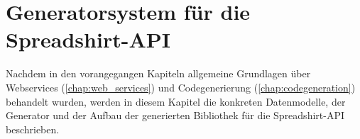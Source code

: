 \chapter{Generatorsystem für die Spreadshirt-API}
\label{chap:generator-system_for_spreadshirt-api}


Nachdem in den vorangegangen Kapiteln allgemeine Grundlagen über Webservices (\cref{chap:web_services}) und Codegenerierung (\cref{chap:codegeneration}) behandelt wurden, werden in diesem Kapitel die konkreten Datenmodelle, der Generator und der Aufbau der generierten Bibliothek für die Spreadshirt-\gls{API} beschrieben.







%
